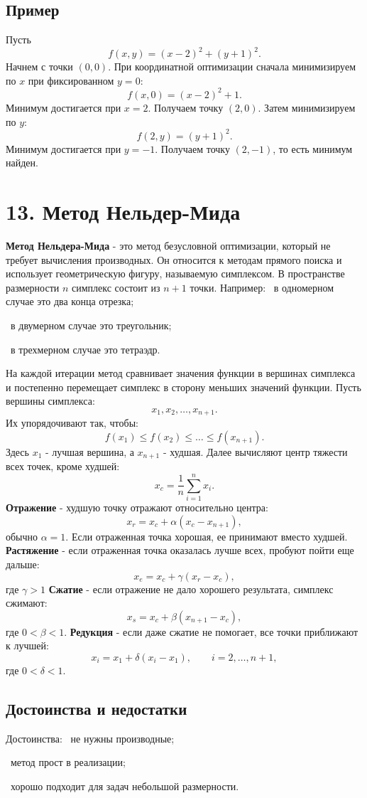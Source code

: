 \documentclass[12pt,a4paper]{article}
\begin{document}
\subsection{Пример}
Пусть
\[
f(x,y)=(x-2)^2+(y+1)^2.
\]
Начнем с точки $(0,0)$.
При координатной оптимизации сначала минимизируем по $x$ при фиксированном $y=0$:
\[
f(x,0)=(x-2)^2+1.
\]
Минимум достигается при $x=2$. Получаем точку $(2,0)$.
Затем минимизируем по $y$:
\[
f(2,y)=(y+1)^2.
\]
Минимум достигается при $y=-1$. Получаем точку $(2,-1)$, то есть минимум найден.

\section{13. Метод Нельдер-Мида}
\textbf{Метод Нельдера-Мида} - это метод безусловной оптимизации, который не требует вычисления производных. Он относится к методам прямого поиска и использует геометрическую фигуру, называемую симплексом.
В пространстве размерности $n$ симплекс состоит из $n+1$ точки. Например:
\noindent\textbullet\ в одномерном случае это два конца отрезка;\par
\noindent\textbullet\ в двумерном случае это треугольник;\par
\noindent\textbullet\ в трехмерном случае это тетраэдр.\par
На каждой итерации метод сравнивает значения функции в вершинах симплекса и постепенно перемещает симплекс в сторону меньших значений функции.
Пусть вершины симплекса:
\[
x_1,x_2,\ldots,x_{n+1}.
\]
Их упорядочивают так, чтобы:
\[
f(x_1)\le f(x_2)\le \ldots \le f(x_{n+1}).
\]
Здесь $x_1$ - лучшая вершина, а $x_{n+1}$ - худшая.
Далее вычисляют центр тяжести всех точек, кроме худшей:
\[
x_c=\frac{1}{n}\sum_{i=1}^{n}x_i.
\]
\textbf{Отражение} - худшую точку отражают относительно центра:
\[
x_r=x_c+\alpha(x_c-x_{n+1}),
\]
обычно $\alpha=1$.
Если отраженная точка хорошая, ее принимают вместо худшей.
\textbf{Растяжение} - если отраженная точка оказалась лучше всех, пробуют пойти еще дальше:
\[
x_e=x_c+\gamma(x_r-x_c),
\]
где $\gamma>1$
\textbf{Сжатие} - если отражение не дало хорошего результата, симплекс сжимают:
\[
x_s=x_c+\beta(x_{n+1}-x_c),
\]
где $0<\beta<1$.
\textbf{Редукция} - если даже сжатие не помогает, все точки приближают к лучшей:
\[
x_i=x_1+\delta(x_i-x_1),\qquad i=2,\ldots,n+1,
\]
где $0<\delta<1$.
\subsection{Достоинства и недостатки}
Достоинства:
\noindent\textbullet\ не нужны производные;\par
\noindent\textbullet\ метод прост в реализации;\par
\noindent\textbullet\ хорошо подходит для задач небольшой размерности.\par
\end{document}

